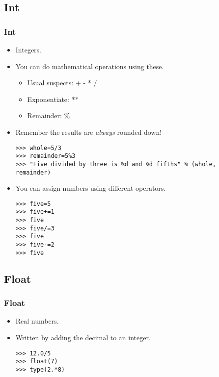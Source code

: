 \documentclass[xcolor=x11names,compress]{beamer}
\renewcommand{\(}{\begin{columns}}
\renewcommand{\)}{\end{columns}}
\newcommand{\<}[1]{\begin{column}{#1}}
\renewcommand{\>}{\end{column}}
\begin{document}
\subsection{Int}
\begin{frame}[fragile]
  \frametitle{Int}
  \begin{itemize}
  	\item Integers. \pause
	\item You can do mathematical operations using these.
	\begin{itemize}
		\item Usual suspects: +  -  * /
		\item Exponentiate: **
		\item Remainder: \%		
	\end{itemize} \pause
	\item Remember the results are \emph{always}  rounded down! \pause
\tiny
\begin{verbatim}
>>> whole=5/3
>>> remainder=5%3
>>> "Five divided by three is %d and %d fifths" % (whole, remainder)
\end{verbatim}
\normalsize
\pause
	\item You can assign numbers using different operators. \pause
\footnotesize
\begin{verbatim}
>>> five=5
>>> five+=1
>>> five
>>> five/=3
>>> five
>>> five-=2
>>> five
\end{verbatim}
\end{itemize}
\end{frame}

\subsection{Float}
\begin{frame}[fragile]
  \frametitle{Float}
  \begin{itemize}
  	\item Real numbers. \pause 
	\item Written by adding the decimal to an integer. \pause
\begin{verbatim}
>>> 12.0/5
>>> float(7)
>>> type(2.*8)
\end{verbatim}	
  \end{itemize}
\end{frame}
\end{document}
